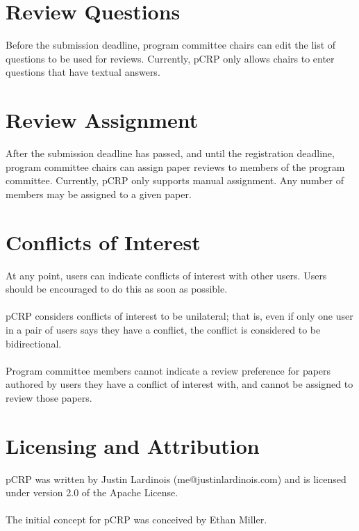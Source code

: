 \documentclass[12pt]{article}
\begin{document}
\section{Review Questions}
	Before the submission deadline, program committee chairs can edit the
	list of questions to be used for reviews. Currently, pCRP only allows
	chairs to enter questions that have textual answers.

\section{Review Assignment}
	After the submission deadline has passed, and until the registration
	deadline, program committee chairs can assign paper reviews to members
	of the program committee. Currently, pCRP only supports manual
	assignment. Any number of members may be assigned to a given paper.

\section{Conflicts of Interest}
	At any point, users can indicate conflicts of interest with other users.
	Users should be encouraged to do this as soon as possible.
	\\\\
	pCRP considers conflicts of interest to be unilateral; that is, even if
	only one user in a pair of users says they have a conflict, the conflict
	is considered to be bidirectional.
	\\\\
	Program committee members cannot indicate a review preference for papers
	authored by users they have a conflict of interest with, and cannot be
	assigned to review those papers.

\section{Licensing and Attribution}
	pCRP was written by Justin Lardinois (me@justinlardinois.com) and is
	licensed under version 2.0 of the Apache License.
	\\\\
	The initial concept for pCRP was conceived by Ethan Miller.



\end{document}
